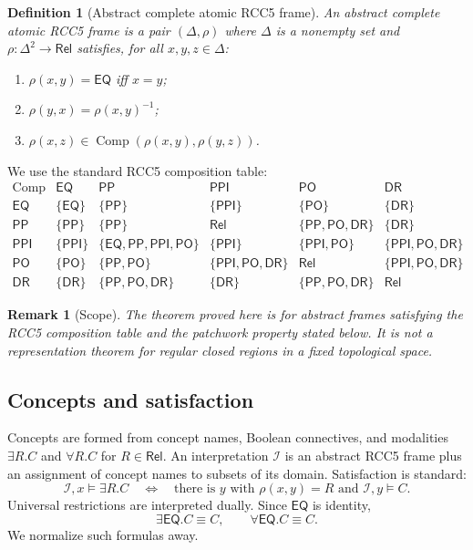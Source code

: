\documentclass[11pt]{article}
\newtheorem{definition}[theorem]{Definition}
\newtheorem{remark}[theorem]{Remark}
\newcommand{\Rel}{\mathsf{Rel}}
\newcommand{\EQ}{\mathsf{EQ}}
\newcommand{\PP}{\mathsf{PP}}
\newcommand{\PPI}{\mathsf{PPI}}
\newcommand{\PO}{\mathsf{PO}}
\newcommand{\DR}{\mathsf{DR}}
\newcommand{\Comp}{\operatorname{Comp}}
\newcommand{\calI}{\mathcal I}
\begin{document}
\begin{definition}[Abstract complete atomic RCC5 frame]
An abstract complete atomic RCC5 frame is a pair $(\Delta,\rho)$ where $\Delta$ is a nonempty set and $\rho:\Delta^2\to\Rel$ satisfies, for all $x,y,z\in\Delta$:
\begin{enumerate}[label=(R\arabic*)]
\item $\rho(x,y)=\EQ$ iff $x=y$;
\item $\rho(y,x)=\rho(x,y)^{-1}$;
\item $\rho(x,z)\in\Comp(\rho(x,y),\rho(y,z))$.
\end{enumerate}
\end{definition}

We use the standard RCC5 composition table:
\[
\begin{array}{c|ccccc}
\Comp & \EQ & \PP & \PPI & \PO & \DR\\\hline
\EQ & \{\EQ\} & \{\PP\} & \{\PPI\} & \{\PO\} & \{\DR\}\\
\PP & \{\PP\} & \{\PP\} & \Rel & \{\PP,\PO,\DR\} & \{\DR\}\\
\PPI & \{\PPI\} & \{\EQ,\PP,\PPI,\PO\} & \{\PPI\} & \{\PPI,\PO\} & \{\PPI,\PO,\DR\}\\
\PO & \{\PO\} & \{\PP,\PO\} & \{\PPI,\PO,\DR\} & \Rel & \{\PPI,\PO,\DR\}\\
\DR & \{\DR\} & \{\PP,\PO,\DR\} & \{\DR\} & \{\PP,\PO,\DR\} & \Rel
\end{array}
\]

\begin{remark}[Scope]
The theorem proved here is for abstract frames satisfying the RCC5 composition table and the patchwork property stated below.  It is not a representation theorem for regular closed regions in a fixed topological space.
\end{remark}

\subsection{Concepts and satisfaction}

Concepts are formed from concept names, Boolean connectives, and modalities $\exists R.C$ and $\forall R.C$ for $R\in\Rel$.  An interpretation $\calI$ is an abstract RCC5 frame plus an assignment of concept names to subsets of its domain.  Satisfaction is standard:
\[
\calI,x\models \exists R.C
\quad\Longleftrightarrow\quad
\text{there is }y\text{ with }\rho(x,y)=R\text{ and }\calI,y\models C.
\]
Universal restrictions are interpreted dually.  Since $\EQ$ is identity,
\[
\exists\EQ.C\equiv C,
\qquad
\forall\EQ.C\equiv C.
\]
We normalize such formulas away.
\end{document}
